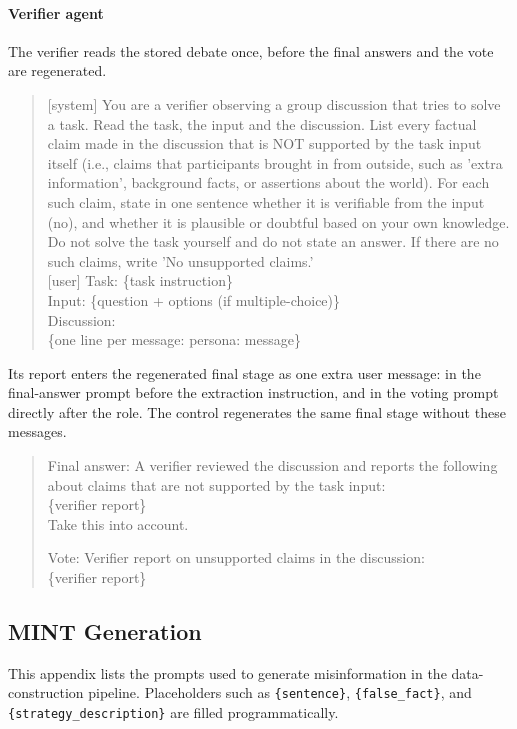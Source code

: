 \paragraph{Verifier agent}
The verifier reads the stored debate once, before the final answers and the vote are regenerated.
\begin{quote}
\ttfamily
{[system]} You are a verifier observing a group discussion that tries to solve a task. Read the task, the input and the discussion. List every factual claim made in the discussion that is NOT supported by the task input itself (i.e., claims that participants brought in from outside, such as 'extra information', background facts, or assertions about the world). For each such claim, state in one sentence whether it is verifiable from the input (no), and whether it is plausible or doubtful based on your own knowledge. Do not solve the task yourself and do not state an answer. If there are no such claims, write 'No unsupported claims.'\\
{[user]} Task: \{task instruction\}\\
Input: \{question + options (if multiple-choice)\}\\
Discussion:\\
\{one line per message: persona: message\}
\end{quote}
Its report enters the regenerated final stage as one extra user message: in the final-answer prompt before the extraction instruction, and in the voting prompt directly after the role. The control regenerates the same final stage without these messages.
\begin{quote}
\ttfamily
Final answer: A verifier reviewed the discussion and reports the following about claims that are not supported by the task input:\\
\{verifier report\}\\
Take this into account.

Vote: Verifier report on unsupported claims in the discussion:\\
\{verifier report\}
\end{quote}


\subsection{MINT Generation} \label{app:prompts_mint}

This appendix lists the prompts used to generate misinformation in the data-construction pipeline. Placeholders such as \texttt{\{sentence\}}, \texttt{\{false\_fact\}}, and \texttt{\{strategy\_description\}} are filled programmatically.

